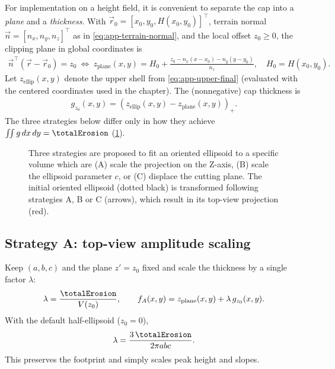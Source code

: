 For implementation on a height field, it is convenient to separate the cap into a \emph{plane} and a \emph{thickness}. With $\vec r_0=[x_0,y_0,H(x_0,y_0)]^\top$, terrain normal $\vec n=[n_x,n_y,n_z]^\top$ as in \cref{eq:app-terrain-normal}, and the local offset $z_0\ge 0$, the clipping plane in global coordinates is
\begin{align}
    \label{eq:app-cap-plane}
    \vec n^\top(\vec r-\vec r_0)=z_0
    \ \Longleftrightarrow\
    z_{\text{plane}}(x,y)=H_0+\frac{z_0-n_x(x-x_0)-n_y(y-y_0)}{n_z},\quad H_0=H(x_0,y_0).
\end{align}
Let $z_{\text{ellip}}(x,y)$ denote the upper shell from \cref{eq:app-upper-final} (evaluated with the centered coordinates used in the chapter). The (nonnegative) cap thickness is
\begin{align}
    \label{eq:app-cap-thickness}
    g_{z_0}(x,y)=\left(z_{\text{ellip}}(x,y)-z_{\text{plane}}(x,y)\right)_+.
\end{align}
The three strategies below differ only in how they achieve $\iint g\,dx\,dy=\totalErosion$ (\cref{fig:ellipsoid-strategies}).

\begin{figure}
    \caption{Three strategies are proposed to fit an oriented ellipsoid to a specific volume which are (A) scale the projection on the Z-axis, (B) scale the ellipsoid parameter $c$, or (C) displace the cutting plane. The initial oriented ellipsoid (dotted black) is transformed following strategies A, B or C (arrows), which result in its top-view projection (red). }
    \label{fig:ellipsoid-strategies}
\end{figure}

\subsection*{Strategy A: top-view amplitude scaling}
Keep $(a,b,c)$ and the plane $z'=z_0$ fixed and scale the thickness by a single factor $\lambda$:
\begin{align}
    \label{eq:app-stratA}
    \lambda=\frac{\totalErosion}{V(z_0)},\qquad
    f_A(x,y)=z_{\text{plane}}(x,y)+\lambda\,g_{z_0}(x,y).
\end{align}
With the default half-ellipsoid ($z_0=0$),
\begin{align}
    \lambda=\frac{3\,\totalErosion}{2\pi a b c}.
\end{align}
This preserves the footprint and simply scales peak height and slopes.

